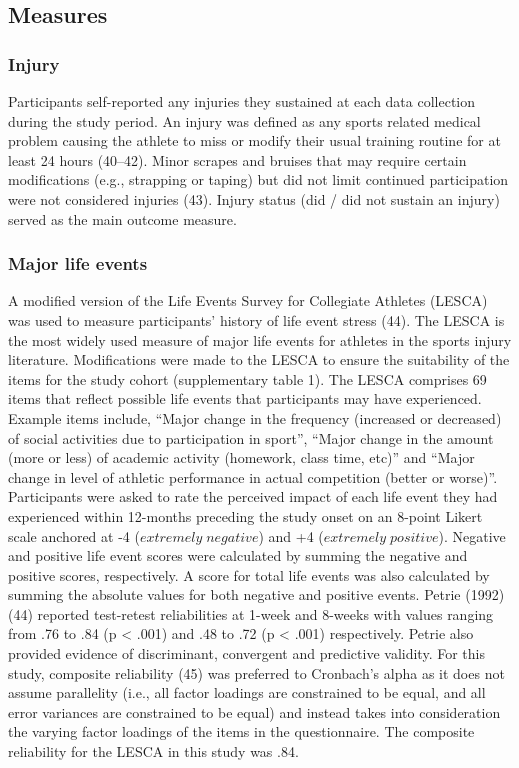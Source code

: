 \documentclass[
  english,
  man]{apa6}
\begin{document}
\hypertarget{measures}{%
\subsection{Measures}\label{measures}}

\hypertarget{injury}{%
\subsubsection{Injury}\label{injury}}

Participants self-reported any injuries they sustained at each data collection during the study period.
An injury was defined as any sports related medical problem causing the athlete to miss or modify their usual training routine for at least 24 hours (40--42).
Minor scrapes and bruises that may require certain modifications (e.g., strapping or taping) but did not limit continued participation were not considered injuries (43).
Injury status (did / did not sustain an injury) served as the main outcome measure.

\hypertarget{major-life-events}{%
\subsubsection{Major life events}\label{major-life-events}}

A modified version of the Life Events Survey for Collegiate Athletes (LESCA) was used to measure participants' history of life event stress (44).
The LESCA is the most widely used measure of major life events for athletes in the sports injury literature.
Modifications were made to the LESCA to ensure the suitability of the items for the study cohort (supplementary table 1).
The LESCA comprises 69 items that reflect possible life events that participants may have experienced. Example items include, ``Major change in the frequency (increased or decreased) of social activities due to participation in sport'', ``Major change in the amount (more or less) of academic activity (homework, class time, etc)'' and ``Major change in level of athletic performance in actual competition (better or worse)''. Participants were asked to rate the perceived impact of each life event they had experienced within 12-months preceding the study onset on an 8-point Likert scale anchored at -4 (\(extremely\;negative\)) and +4 (\(extremely\;positive\)).
Negative and positive life event scores were calculated by summing the negative and positive scores, respectively. A score for total life events was also calculated by summing the absolute values for both negative and positive events.
Petrie (1992) (44) reported test-retest reliabilities at 1-week and 8-weeks with values ranging from .76 to .84 (p \textless{} .001) and .48 to .72 (p \textless{} .001) respectively. Petrie also provided evidence of discriminant, convergent and predictive validity. For this study, composite reliability (45) was preferred to Cronbach's alpha as it does not assume parallelity (i.e., all factor loadings are constrained to be equal, and all error variances are constrained to be equal) and instead takes into consideration the varying factor loadings of the items in the questionnaire. The composite reliability for the LESCA in this study was .84.
\end{document}
